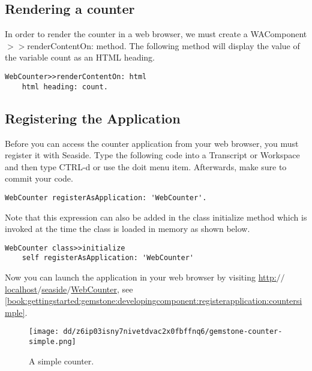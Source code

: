 \documentclass[a4paper,10pt,twoside]{book}
\newcommand{\ct}[1]{{\small\ttfamily\textup{#1}}}
\begin{document}
\subsection{Rendering a counter}
\label{book:gettingstarted:gemstone:developingcomponent:renderingcounter}

In order to render the counter in a web browser, we must create a  \ct{WAComponent$>$$>$renderContentOn:}  method. The following method will display the value of the variable \ct{count} as an HTML heading.

\begin{lstlisting}
WebCounter>>renderContentOn: html
    html heading: count.
\end{lstlisting}

\subsection{Registering the Application}
\label{book:gettingstarted:gemstone:developingcomponent:registerapplication}

Before you can access the counter application from your web browser, you must register it with Seaside. Type the following code into a Transcript or Workspace and then type CTRL-d or use the doit menu item. Afterwards, make sure to commit your code.

\begin{lstlisting}
WebCounter registerAsApplication: 'WebCounter'.
\end{lstlisting}

Note that this expression can also be added in the class \ct{initialize} method which is invoked at the time the class is loaded in memory as shown below.

\begin{lstlisting}
WebCounter class>>initialize
    self registerAsApplication: 'WebCounter'
\end{lstlisting}

Now you can launch the application in your web browser by visiting 
\href{http://localhost/seaside/WebCounter}{http:$/$$/$localhost$/$seaside$/$WebCounter}, see \autoref{book:gettingstarted:gemstone:developingcomponent:registerapplication:countersimple}.

\begin{figure}[h!tbp]
	\begin{center}
		\texttt{[image: dd/z6ip03isny7nivetdvac2x0fbffnq6/gemstone-counter-simple.png]}
		\caption{A simple counter.\label{book:gettingstarted:gemstone:developingcomponent:registerapplication:countersimple}}
	\end{center}
\end{figure}
\end{document}
